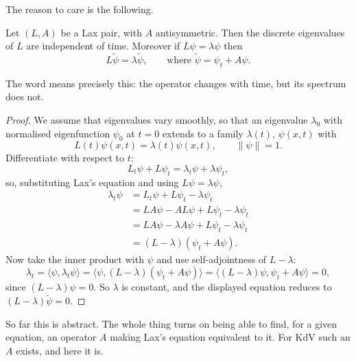 \documentclass[a4paper]{scrartcl}
\newcommand{\ip}[2]{\langle #1, #2 \rangle}
\begin{document}
The reason to care is the following.

\begin{theorem}
	Let $(L,A)$ be a Lax pair, with $A$ antisymmetric. Then the discrete eigenvalues of $L$ are independent of time. Moreover if $L\psi = \lambda\psi$ then
	$$
	L\tilde\psi = \lambda\tilde\psi, \qquad \text{where }\tilde\psi = \psi_t + A\psi.
	$$
\end{theorem}

The word  means precisely this: the operator changes with time, but its spectrum does not.

\begin{proof}
	We assume that eigenvalues vary smoothly, so that an eigenvalue $\lambda_0$ with normalised eigenfunction $\psi_0$ at $t=0$ extends to a family $\lambda(t)$, $\psi(x,t)$ with
	$$
	L(t)\psi(x,t) = \lambda(t)\psi(x,t), \qquad \|\psi\| = 1.
	$$
	Differentiate with respect to $t$:
	$$
	L_t\psi + L\psi_t = \lambda_t\psi + \lambda\psi_t,
	$$
	so, substituting Lax's equation and using $L\psi = \lambda\psi$,
	\begin{align*}
		\lambda_t\psi &= L_t\psi + L\psi_t - \lambda\psi_t\\
		&= LA\psi - AL\psi + L\psi_t - \lambda\psi_t\\
		&= LA\psi - \lambda A\psi + L\psi_t - \lambda\psi_t\\
		&= (L-\lambda)\left(\psi_t + A\psi\right).
	\end{align*}
	Now take the inner product with $\psi$ and use self-adjointness of $L - \lambda$:
	$$
	\lambda_t = \ip{\psi}{\lambda_t\psi} = \ip{\psi}{(L-\lambda)(\psi_t + A\psi)} = \ip{(L-\lambda)\psi}{\psi_t + A\psi} = 0,
	$$
	since $(L-\lambda)\psi = 0$. So $\lambda$ is constant, and the displayed equation reduces to $(L-\lambda)\tilde\psi = 0$.
\end{proof}

So far this is abstract. The whole thing turns on being able to find, for a given equation, an operator $A$ making Lax's equation equivalent to it. For KdV such an $A$ exists, and here it is.
\end{document}
